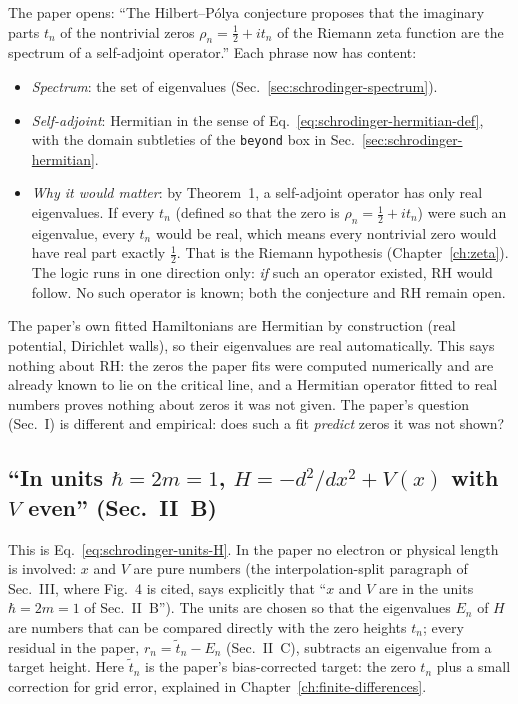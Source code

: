 The paper opens: ``The Hilbert--P\'olya conjecture proposes that the imaginary parts $t_n$ of the nontrivial zeros $\rho_n=\tfrac12+it_n$ of the Riemann zeta function are the spectrum of a self-adjoint operator.'' Each phrase now has content:
\begin{itemize}
\item \emph{Spectrum}: the set of eigenvalues (Sec.~\ref{sec:schrodinger-spectrum}).
\item \emph{Self-adjoint}: Hermitian in the sense of Eq.~\eqref{eq:schrodinger-hermitian-def}, with the domain subtleties of the \texttt{beyond} box in Sec.~\ref{sec:schrodinger-hermitian}.
\item \emph{Why it would matter}: by Theorem~1, a self-adjoint operator has only real eigenvalues. If every $t_n$ (defined so that the zero is $\rho_n=\tfrac12+it_n$) were such an eigenvalue, every $t_n$ would be real, which means every nontrivial zero would have real part exactly $\tfrac12$. That is the Riemann hypothesis (Chapter~\ref{ch:zeta}). The logic runs in one direction only: \emph{if} such an operator existed, RH would follow. No such operator is known; both the conjecture and RH remain open.
\end{itemize}
The paper's own fitted Hamiltonians are Hermitian by construction (real potential, Dirichlet walls), so their eigenvalues are real automatically. This says nothing about RH: the zeros the paper fits were computed numerically and are already known to lie on the critical line, and a Hermitian operator fitted to real numbers proves nothing about zeros it was not given. The paper's question (Sec.~I) is different and empirical: does such a fit \emph{predict} zeros it was not shown?

\subsection{``In units $\hbar=2m=1$, $H=-d^2/dx^2+V(x)$ with $V$ even'' (Sec.~II~B)}

This is Eq.~\eqref{eq:schrodinger-units-H}. In the paper no electron or physical length is involved: $x$ and $V$ are pure numbers (the interpolation-split paragraph of Sec.~III, where Fig.~4 is cited, says explicitly that ``$x$ and $V$ are in the units $\hbar=2m=1$ of Sec.~II~B''). The units are chosen so that the eigenvalues $E_n$ of $H$ are numbers that can be compared directly with the zero heights $t_n$; every residual in the paper, $r_n=\tilde t_n-E_n$ (Sec.~II~C), subtracts an eigenvalue from a target height. Here $\tilde t_n$ is the paper's bias-corrected target: the zero $t_n$ plus a small correction for grid error, explained in Chapter~\ref{ch:finite-differences}.

